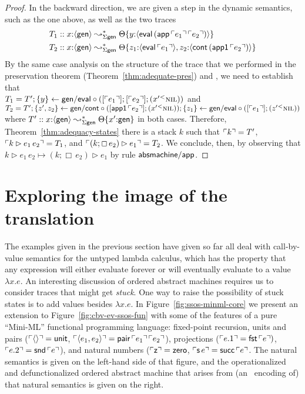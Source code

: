\begin{proof}
  In the backward direction, we are given a step in the dynamic 
  semantics, such as the one above, as well as the two traces 
  \begin{align*}
  T_1
  & :: x{:}\langle {\sf gen} \rangle \leadsto^*_{\Sigma\sf gen}
       {\Theta}\{{y{:}\langle {{\sf eval}\,({\sf app}\,{\ulcorner{e_1}\urcorner}\,{\ulcorner{e_2}\urcorner})} \rangle}\}
\\
  T_2
  & :: x{:}\langle {\sf gen} \rangle \leadsto^*_{\Sigma\sf gen}
       {\Theta}\{{{z_1{:}\langle {{\sf eval}\,{\ulcorner{e_1}\urcorner}} \rangle},{z_2{:}\langle {{\sf cont}\,({\sf app1}\,{\ulcorner{e_2}\urcorner})} \rangle}}\}
  \end{align*}
  By the same case analysis on the structure of the trace that we performed
  in the preservation theorem (Theorem~\ref{thm:adequate-pres}) and
  , we 
  need to establish that \medskip \\
  $T_1 = T'; \{{y}\} \leftarrow {\sf gen/eval} \circ {([{{\ulcorner{e_1}\urcorner}}]; {[{{\ulcorner{e_2}\urcorner}}]; {({x'}{^{<}}{\textsc{nil}})}})}$ and \\
  $T_2 = T'; \{{z', z_2}\} \leftarrow {\sf gen/cont} \circ {([{{\sf app1}\,{\ulcorner{e_2}\urcorner}}]; {({x'}{^{<}}{\textsc{nil}})})}; \{{z_1}\} \leftarrow {\sf gen/eval} \circ {([{{\ulcorner{e_1}\urcorner}}]; {({z'}{^{<}}{\textsc{nil}})})}$ \medskip\\
  where $T' :: x{:}\langle {\sf gen} \rangle \leadsto^*_{\Sigma\sf gen}
  {\Theta}\{{x'{:}{\sf gen}}\}$ in both cases. Therefore,
  Theorem~\ref{thm:adequacy-states} there is a stack $k$ such that
  ${\ulcorner{k}\urcorner} = T'$, ${\ulcorner{k \rhd e_1\,e_2}\urcorner} = T_1$, and
  ${\ulcorner{(k; \Box\,e_2) \rhd e_1}\urcorner} = T_2$.
  We conclude, then, by observing that 
  $k \rhd e_1\,e_2 \mapsto (k; \Box\,e_2) \rhd e_1$ by rule 
  ${\sf absmachine/app}$.
\end{proof}



\section{Exploring the image of the translation}
\label{sec:absmachine-nondeterminism}

The examples given in the previous section have given so far all deal
with call-by-value semantics for the untyped lambda calculus, which
has the property that any expression will either evaluate forever or
will eventually evaluate to a value $\lambda x. e$. An interesting
discussion of ordered abstract machines requires us to consider traces
that might get {\it stuck}. One way to raise the possibility of stuck
states is to add values besides $\lambda x.e$. In
Figure~\ref{fig:ssos-minml-core} we present an extension to
Figure~\ref{fig:cbv-ev-ssos-fun} with some of the features of a pure
``Mini-ML'' functional programming language: fixed-point recursion,
units and pairs (${\ulcorner{\langle\rangle}\urcorner} = {\sf unit}$,
${\ulcorner{\langle e_1, e_2 \rangle}\urcorner} = {\sf
  pair}\,{\ulcorner{e_1}\urcorner}\,{\ulcorner{e_2}\urcorner}$), projections (${\ulcorner{e.1}\urcorner} =
{\sf fst}\,{\ulcorner{e}\urcorner})$, ${\ulcorner{e.2}\urcorner} = {\sf snd}\,{\ulcorner{e}\urcorner}$), and
natural numbers (${\ulcorner{{\sf z}}\urcorner} = {\sf zero}$, ${\ulcorner{{\sf s}\,e}\urcorner}
= {\sf succ}\,{\ulcorner{e}\urcorner}$.  The natural semantics is given on the
left-hand side of that figure, and the operationalized and
defunctionalized ordered abstract machine that arises from (an
\sls~encoding of) that natural semantics is given on the right.

